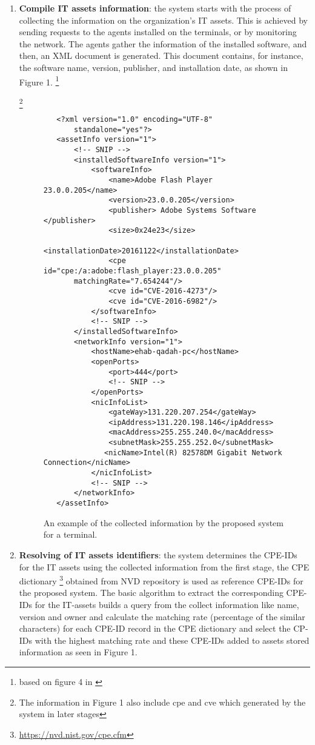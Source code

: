 \documentclass{llncs}
\begin{document}
\begin{enumerate}
 \item \textbf{Compile IT assets information}: the system starts with the process of collecting the information on the organization's IT assets. This is achieved by sending requests to the agents installed on the terminals, or by monitoring the network. The agents gather the information of the installed software, and then, an XML document is generated. This document contains, for instance, the software name, version, publisher, and installation date, as shown in Figure 1.  \footnote{based on figure 4 in \cite{paper1}} 
 
 \footnote{The information in Figure 1 also include cpe and cve which generated by the system in later stages}
 
 \begin{figure}
 \centering
   \lstset{language=XML}
    \begin{lstlisting}
   <?xml version="1.0" encoding="UTF-8"
       standalone="yes"?>
   <assetInfo version="1">
       <!-- SNIP -->
       <installedSoftwareInfo version="1">
           <softwareInfo>
               <name>Adobe Flash Player 23.0.0.205</name>
               <version>23.0.0.205</version>
               <publisher> Adobe Systems Software </publisher>
               <size>0x24e23</size>
               <installationDate>20161122</installationDate>
               <cpe id="cpe:/a:adobe:flash_player:23.0.0.205"
       matchingRate="7.654244"/>
               <cve id="CVE-2016-4273"/>
               <cve id="CVE-2016-6982"/>
           </softwareInfo>
           <!-- SNIP -->
       </installedSoftwareInfo>
       <networkInfo version="1">
           <hostName>ehab-qadah-pc</hostName>
           <openPorts>
               <port>444</port>
               <!-- SNIP -->
           </openPorts>
           <nicInfoList>
               <gateWay>131.220.207.254</gateWay>
               <ipAddress>131.220.198.146</ipAddress>
               <macAddress>255.255.240.0</macAddress>
               <subnetMask>255.255.252.0</subnetMask>
              <nicName>Intel(R) 82578DM Gigabit Network Connection</nicName>
           </nicInfoList>
           <!-- SNIP -->
       </networkInfo>
   </assetInfo>
    \end{lstlisting}
   \caption{An example of the collected information by the proposed system for  a terminal.}
    \end{figure}
   
   
   
   \item \textbf{Resolving of IT assets identifiers}: the system determines the CPE-IDs for the IT assets using the collected information from the first stage, the CPE dictionary \footnote{\url{https://nvd.nist.gov/cpe.cfm}} obtained from NVD repository is used as reference CPE-IDs for the proposed system. The basic algorithm to extract the corresponding CPE-IDs for the IT-assets builds a query from the collect information like name, version and owner and calculate the matching rate (percentage of the similar characters) for each CPE-ID record in the CPE dictionary and select the CP-IDs with the highest matching rate and these CPE-IDs added to assets stored information as seen in Figure 1.
   

\end{enumerate}
\end{document}
